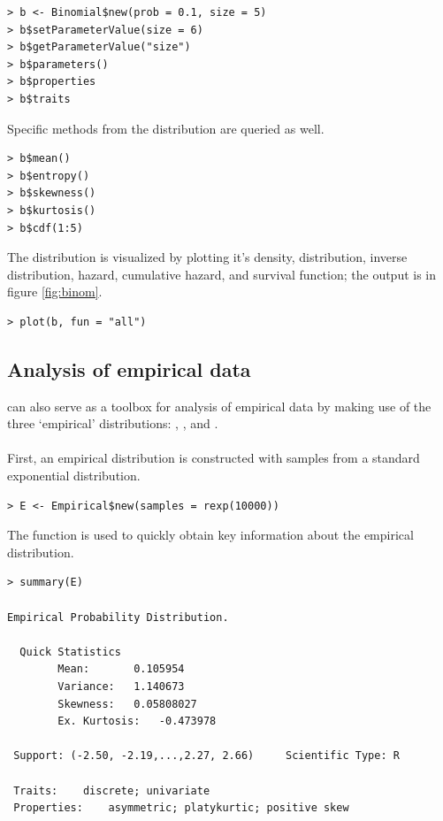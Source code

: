 \begin{verbatim}
> b <- Binomial$new(prob = 0.1, size = 5)
> b$setParameterValue(size = 6)
> b$getParameterValue("size")
> b$parameters()
> b$properties
> b$traits
\end{verbatim}

Specific methods from the distribution are queried as well.

\begin{verbatim}
> b$mean()
> b$entropy()
> b$skewness()
> b$kurtosis()
> b$cdf(1:5)
\end{verbatim}

The distribution is visualized by plotting it's density, distribution, inverse distribution, hazard, cumulative hazard, and survival function; the output is in figure \ref{fig:binom}.

\begin{verbatim}
> plot(b, fun = "all")
\end{verbatim}

\subsection{Analysis of empirical data}

 can also serve as a toolbox for analysis of empirical data by making use of the three `empirical' distributions: , , and .
\\\\
First, an empirical distribution is constructed with samples from a standard exponential distribution.

\begin{verbatim}
> E <- Empirical$new(samples = rexp(10000))
\end{verbatim}

The  function is used to quickly obtain key information about the empirical distribution.

\begin{verbatim}
> summary(E)

Empirical Probability Distribution.

  Quick Statistics
	    Mean:		0.105954
	    Variance:	1.140673
	    Skewness:	0.05808027
	    Ex. Kurtosis:	-0.473978

 Support: (-2.50, -2.19,...,2.27, 2.66) 	Scientific Type: R

 Traits:	discrete; univariate
 Properties:	asymmetric; platykurtic; positive skew
\end{verbatim}

